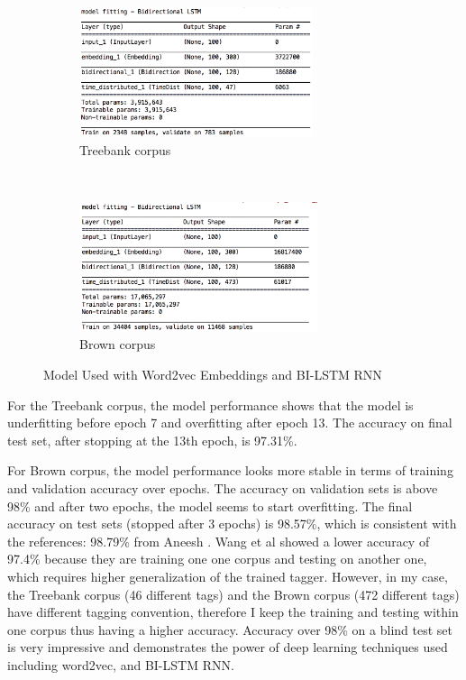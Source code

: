 \documentclass[11pt]{article}
\theoremstyle{plain}
\begin{document}
\begin{figure}[!ht]
	\centering
	\begin{subfigure}[b]{\textwidth}
		\centering
		\includegraphics[height=1.5in]{images/model-lstm-tree.png}
		\caption{Treebank corpus}
	\end{subfigure}%
	\\
	\begin{subfigure}[b]{\textwidth}
		\centering
		\includegraphics[height=1.5in]{images/model-lstm-brown.png}
		\caption{Brown corpus}
	\end{subfigure}
	\caption{Model Used  with Word2vec Embeddings and BI-LSTM 
	RNN}\label{f:mw2v}
\end{figure}

For the Treebank corpus, the model performance shows that the model is 
underfitting before epoch 7 and overfitting after epoch 13. The accuracy 
on final test set, after stopping at the 13th epoch, is 97.31\%. 

For Brown corpus, the model performance looks more stable in terms of 
training and validation accuracy over epochs. The 
accuracy on validation sets is above 98\% and after two epochs, the 
model seems to start overfitting. The final accuracy on test sets (stopped 
after 3 epochs) is 98.57\%, which is consistent with the references: 98.79\% 
from Aneesh \cite{aneesh-joshi-LSTM-POS-Tagger}. Wang et al 
\cite{Wang2015PartofSpeechTW} showed a lower accuracy of 97.4\% 
because they are training one one corpus and testing on another one, which 
requires higher generalization of the trained tagger. However, in my case, the 
Treebank corpus (46 different tags) and the Brown corpus (472 different 
tags) have different tagging convention, therefore I keep the training and 
testing within one corpus thus having a higher accuracy. Accuracy over 98\% 
on a blind test set is very impressive and demonstrates the power of deep 
learning techniques used including word2vec, and BI-LSTM RNN. 
\end{document}
